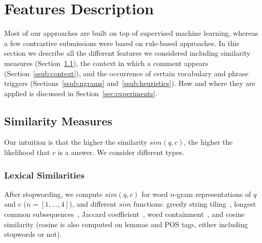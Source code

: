 \section{Features Description}
\label{sec:approach}

Most of our approaches are built on top of supervised machine learning, whereas 
a few contrastive submissions were based on rule-based approaches. In this 
section we describe all the different features we considered including 
similarity measures (Section~\ref{sub:sim}), the context in which a comment 
appears 
(Section~\ref{ssub:context}), and the occurrence of certain vocabulary and 
phrase triggers (Sections~\ref{ssub:ngrams} and~\ref{ssub:heuristics}). How and 
where they are applied is discussed in Section~\ref{sec:experiments}.

% 

\subsection{Similarity Measures}
\label{sub:sim}

Our intuition is that the higher the similarity  $sim(q,c)$, the higher the 
likelihood that $c$ is a \good answer. We consider different types.

\subsubsection{Lexical Similarities}

After stopwording, we compute $sim(q, c)$ for word $n$-gram representations of 
$q$ and $c$ ($n=[1,\ldots,4]$), and different $sim$ functions: greedy string 
tiling~\cite{Wise:1996}, longest common subsequences~\cite{Allison:1986}, 
Jaccard coefficient~\cite{Jaccard:1901}, word containment~\cite{Lyon:2001}, and 
cosine similarity (cosine is also computed on lemmas and POS tags, either 
including stopwords or not).

